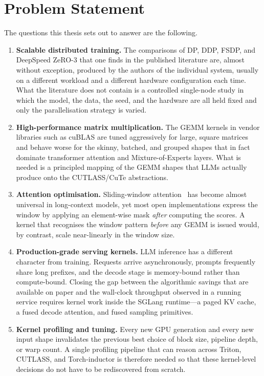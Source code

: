 \section{Problem Statement}\label{sec:intro_problem}
The questions this thesis sets out to answer are the following.
\begin{enumerate}
    \item \textbf{Scalable distributed training.} The comparisons of
          DP, DDP, FSDP, and DeepSpeed ZeRO-3 that one finds in the
          published literature are, almost without exception, produced
          by the authors of the individual system, usually on a
          different workload and a different hardware configuration
          each time. What the literature does not contain is a
          controlled single-node study in which the model, the data,
          the seed, and the hardware are all held fixed and only the
          parallelisation strategy is varied.
    \item \textbf{High-performance matrix multiplication.} The GEMM
          kernels in vendor libraries such as cuBLAS are tuned
          aggressively for large, square matrices and behave worse
          for the skinny, batched, and grouped shapes that in fact
          dominate transformer attention and Mixture-of-Experts
          layers. What is needed is a principled mapping of the
          GEMM shapes that LLMs actually produce onto the
          CUTLASS/CuTe abstractions.
    \item \textbf{Attention optimisation.} Sliding-window
          attention~\cite{beltagy2020longformer} has become almost
          universal in long-context models, yet most open
          implementations express the window by applying an
          element-wise mask \emph{after} computing the scores. A
          kernel that recognises the window pattern \emph{before}
          any GEMM is issued would, by contrast, scale near-linearly
          in the window size.
    \item \textbf{Production-grade serving kernels.} LLM inference
          has a different character from training. Requests arrive
          asynchronously, prompts frequently share long prefixes,
          and the decode stage is memory-bound rather than
          compute-bound. Closing the gap between the algorithmic
          savings that are available on paper and the wall-clock
          throughput observed in a running service requires kernel
          work inside the SGLang runtime---a paged KV cache, a
          fused decode attention, and fused sampling primitives.
    \item \textbf{Kernel profiling and tuning.} Every new GPU
          generation and every new input shape invalidates the
          previous best choice of block size, pipeline depth, or
          warp count. A single profiling pipeline that can reason
          across Triton, CUTLASS, and Torch-inductor is therefore
          needed so that these kernel-level decisions do not have
          to be rediscovered from scratch.
\end{enumerate}

